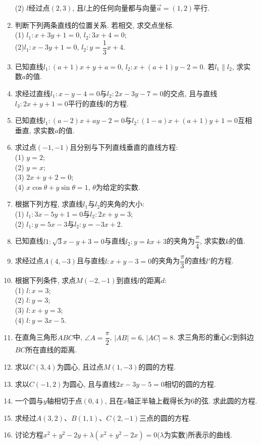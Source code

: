 \documentclass[10pt,a4paper]{article}
\begin{document}
\begin{enumerate}[1.]
(2) $l$经过点$(2,3)$, 且$l$上的任何向量都与向量$\overrightarrow a=(1,2)$平行.
\item 判断下列两条直线的位置关系. 若相交, 求交点坐标.\\
(1) $l_1: x+3y+1=0$, $l_2: 3x+4=0$;\\
(2)$ l_1: x-3y+1=0$, $l_2: y=\dfrac 13x+4$.
\item 已知直线$l_1: (a+1)x+y+a=0$, $l_2:x+(a+1)y-2=0$. 若$l_1\parallel l_2$, 求实数$a$的值.
\item 求经过直线$l_1: x-y-4=0$与$l_2:2x-3y-7=0$的交点, 且与直线$l_3: 2x+y+1=0$平行的直线$l$的方程. 
\item 已知直线$l_1:(a-2)x+ay-2=0$与$l_2:(1-a)x+(a+1)y+1=0$互相垂直, 求实数$a$的值.
\item 求过点$(-1,-1)$且分别与下列直线垂直的直线方程:\\
(1) $y=2$;\\
(2) $y=x$;\\
(3) $2x+y+2=0$;\\
(4) $x\cos\theta +y\sin \theta =1$, $\theta$为给定的实数. 
\item 根据下列方程, 求直线$l_1$与$l_2$的夹角的大小:\\
(1) $l_1: 3x-5y+1=0$与$l_2:2x+y=3$;\\
(2) $l_1: y=5x-3$与$l_2:y=-3x+2$.
\item 已知直线$l1:\sqrt 3x-y+3=0$与直线$l_2: y=kx+3$的夹角为$\dfrac \pi 4$, 求实数$k$的值.
\item 求经过点$A(4,-3)$且与直线$l: x+y-3=0$的夹角为$\dfrac\pi 3$的直线$l'$的方程. 
\item 根据下列条件, 求点$M(-2,-1)$到直线$l$的距离$d$:\\
(1) $l: x=3$;\\
(2) $l: y=3$;\\
(3) $l: x+y=3$;\\
(4) $l: y=3x-5$.
\item 在直角三角形$ABC$中, $\angle A=\dfrac \pi 2$, $|AB|=6$, $|AC|=8$. 求三角形的重心$G$到斜边$BC$所在直线的距离. 
\item 求以$C(3,4)$为圆心, 且过点$M(1,-3)$的圆的方程.
\item 求以$C(-1,2)$为圆心, 且与直线$2x-3y-5=0$相切的圆的方程.
\item 一个圆与$y$轴相切于点$(0,4)$, 且在$x$轴正半轴上截得长为$6$的弦. 求此圆的方程. 
\item 求经过$A(3,2)$、$B(1,1)$、$C(2,-1)$三点的圆的方程.
\item 讨论方程$x^2+y^2-2y+\lambda (x^2+y^2-2x)=0$($\lambda$为实数)所表示的曲线.

\end{enumerate}
\end{document}

